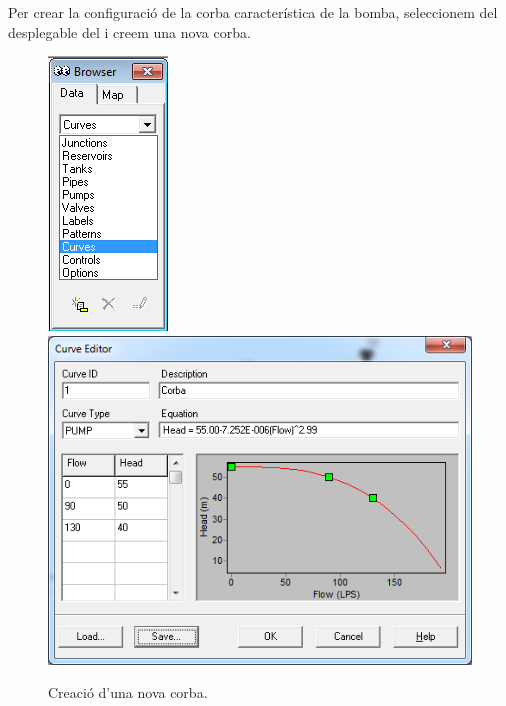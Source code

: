 \documentclass[12pt]{article}
\begin{document}
\pagebreak
Per crear la configuració de la corba característica de la bomba, seleccionem  del desplegable del  i creem una nova corba.
\begin{figure}[h!]
	\centering
	\includegraphics[scale=0.6]{imatges/epanet/10.png}
	\includegraphics[scale=0.4]{imatges/epanet/11.png}
	\caption{Creació d'una nova corba.}
\end{figure}

\clearpage
\end{document}
